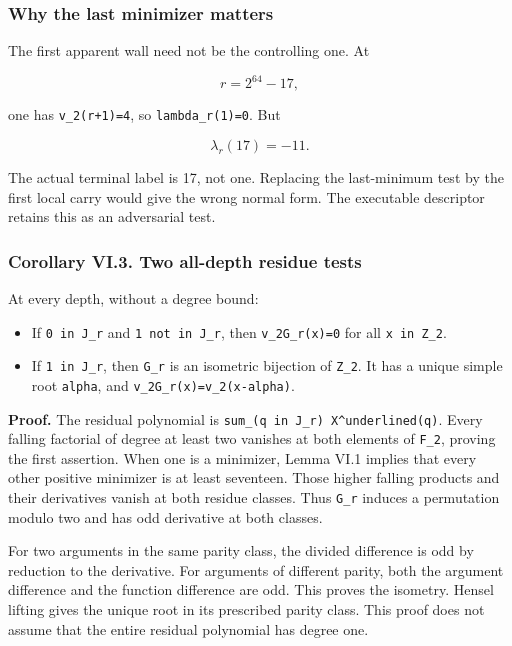\documentclass[11pt,letterpaper]{article}
\providecommand{\tightlist}{\setlength{\itemsep}{0pt}\setlength{\parskip}{0pt}}
\begin{document}
\subsubsection{Why the last minimizer matters}\label{why-the-last-minimizer-matters}

The first apparent wall need not be the controlling one. At

\[
r=2^{64}-17,
\]

one has \texttt{v\_2(r+1)=4}, so \texttt{lambda\_r(1)=0}. But

\[
\lambda_r(17)=-11.
\]

The actual terminal label is 17, not one. Replacing the last-minimum test by the first local carry would give the wrong normal form. The executable descriptor retains this as an adversarial test.

\subsubsection{Corollary VI.3. Two all-depth residue tests}\label{corollary-vi.3.-two-all-depth-residue-tests}

At every depth, without a degree bound:

\begin{itemize}
\tightlist
\item
  If \texttt{0\ in\ J\_r} and \texttt{1\ not\ in\ J\_r}, then \texttt{v\_2G\_r(x)=0} for all \texttt{x\ in\ Z\_2}.
\item
  If \texttt{1\ in\ J\_r}, then \texttt{G\_r} is an isometric bijection of \texttt{Z\_2}. It has a unique simple root \texttt{alpha}, and \texttt{v\_2G\_r(x)=v\_2(x-alpha)}.
\end{itemize}

\textbf{Proof.} The residual polynomial is \texttt{sum\_(q\ in\ J\_r)\ X\^{}underlined(q)}. Every falling factorial of degree at least two vanishes at both elements of \texttt{F\_2}, proving the first assertion. When one is a minimizer, Lemma VI.1 implies that every other positive minimizer is at least seventeen. Those higher falling products and their derivatives vanish at both residue classes. Thus \texttt{G\_r} induces a permutation modulo two and has odd derivative at both classes.

For two arguments in the same parity class, the divided difference is odd by reduction to the derivative. For arguments of different parity, both the argument difference and the function difference are odd. This proves the isometry. Hensel lifting gives the unique root in its prescribed parity class. This proof does not assume that the entire residual polynomial has degree one.
\end{document}
